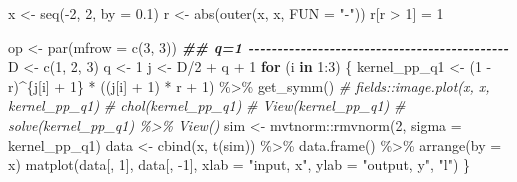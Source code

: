 \documentclass[
]{article}
\newenvironment{Shaded}{\begin{snugshade}}{\end{snugshade}}
\newcommand{\AttributeTok}[1]{\textcolor[rgb]{0.77,0.63,0.00}{#1}}
\newcommand{\CommentTok}[1]{\textcolor[rgb]{0.56,0.35,0.01}{\textit{#1}}}
\newcommand{\ControlFlowTok}[1]{\textcolor[rgb]{0.13,0.29,0.53}{\textbf{#1}}}
\newcommand{\DecValTok}[1]{\textcolor[rgb]{0.00,0.00,0.81}{#1}}
\newcommand{\DocumentationTok}[1]{\textcolor[rgb]{0.56,0.35,0.01}{\textbf{\textit{#1}}}}
\newcommand{\FloatTok}[1]{\textcolor[rgb]{0.00,0.00,0.81}{#1}}
\newcommand{\FunctionTok}[1]{\textcolor[rgb]{0.00,0.00,0.00}{#1}}
\newcommand{\NormalTok}[1]{#1}
\newcommand{\OtherTok}[1]{\textcolor[rgb]{0.56,0.35,0.01}{#1}}
\newcommand{\SpecialCharTok}[1]{\textcolor[rgb]{0.00,0.00,0.00}{#1}}
\newcommand{\StringTok}[1]{\textcolor[rgb]{0.31,0.60,0.02}{#1}}
\begin{document}
\begin{Shaded}
\begin{Highlighting}[]
\NormalTok{x }\OtherTok{\textless{}{-}} \FunctionTok{seq}\NormalTok{(}\SpecialCharTok{{-}}\DecValTok{2}\NormalTok{, }\DecValTok{2}\NormalTok{, }\AttributeTok{by =} \FloatTok{0.1}\NormalTok{)}
\NormalTok{r }\OtherTok{\textless{}{-}} \FunctionTok{abs}\NormalTok{(}\FunctionTok{outer}\NormalTok{(x, x, }\AttributeTok{FUN =} \StringTok{"{-}"}\NormalTok{))}
\NormalTok{r[r }\SpecialCharTok{\textgreater{}} \DecValTok{1}\NormalTok{] }\OtherTok{=} \DecValTok{1}

\NormalTok{op }\OtherTok{\textless{}{-}} \FunctionTok{par}\NormalTok{(}\AttributeTok{mfrow =} \FunctionTok{c}\NormalTok{(}\DecValTok{3}\NormalTok{, }\DecValTok{3}\NormalTok{))}
\DocumentationTok{\#\# q=1 {-}{-}{-}{-}{-}{-}{-}{-}{-}{-}{-}{-}{-}{-}{-}{-}{-}{-}{-}{-}{-}{-}{-}{-}{-}{-}{-}{-}{-}{-}{-}{-}{-}{-}{-}{-}{-}{-}{-}{-}{-}{-}{-}{-}{-}}
\NormalTok{D }\OtherTok{\textless{}{-}} \FunctionTok{c}\NormalTok{(}\DecValTok{1}\NormalTok{, }\DecValTok{2}\NormalTok{, }\DecValTok{3}\NormalTok{)}
\NormalTok{q }\OtherTok{\textless{}{-}} \DecValTok{1}
\NormalTok{j }\OtherTok{\textless{}{-}}\NormalTok{ D}\SpecialCharTok{/}\DecValTok{2} \SpecialCharTok{+}\NormalTok{ q }\SpecialCharTok{+} \DecValTok{1}
\ControlFlowTok{for}\NormalTok{ (i }\ControlFlowTok{in} \DecValTok{1}\SpecialCharTok{:}\DecValTok{3}\NormalTok{) \{}
\NormalTok{  kernel\_pp\_q1 }\OtherTok{\textless{}{-}}\NormalTok{ (}\DecValTok{1} \SpecialCharTok{{-}}\NormalTok{ r)}\SpecialCharTok{\^{}}\NormalTok{\{j[i] }\SpecialCharTok{+} \DecValTok{1}\NormalTok{\} }\SpecialCharTok{*} 
\NormalTok{    ((j[i] }\SpecialCharTok{+} \DecValTok{1}\NormalTok{) }\SpecialCharTok{*}\NormalTok{ r }\SpecialCharTok{+} \DecValTok{1}\NormalTok{) }\SpecialCharTok{\%\textgreater{}\%} \FunctionTok{get\_symm}\NormalTok{()}
  \CommentTok{\# fields::image.plot(x, x, kernel\_pp\_q1)}
  \CommentTok{\# chol(kernel\_pp\_q1)}
  \CommentTok{\# View(kernel\_pp\_q1)}
  \CommentTok{\# solve(kernel\_pp\_q1) \%\textgreater{}\% View()}
\NormalTok{  sim }\OtherTok{\textless{}{-}}\NormalTok{ mvtnorm}\SpecialCharTok{::}\FunctionTok{rmvnorm}\NormalTok{(}\DecValTok{2}\NormalTok{, }\AttributeTok{sigma =}\NormalTok{ kernel\_pp\_q1)}
\NormalTok{  data }\OtherTok{\textless{}{-}} \FunctionTok{cbind}\NormalTok{(x, }\FunctionTok{t}\NormalTok{(sim)) }\SpecialCharTok{\%\textgreater{}\%} 
    \FunctionTok{data.frame}\NormalTok{() }\SpecialCharTok{\%\textgreater{}\%}
    \FunctionTok{arrange}\NormalTok{(}\AttributeTok{by =}\NormalTok{ x)}
  \FunctionTok{matplot}\NormalTok{(data[, }\DecValTok{1}\NormalTok{], data[, }\SpecialCharTok{{-}}\DecValTok{1}\NormalTok{], }\AttributeTok{xlab =} \StringTok{"input, x"}\NormalTok{, }\AttributeTok{ylab =} \StringTok{"output, y"}\NormalTok{, }\StringTok{"l"}\NormalTok{)}
\NormalTok{\}}



\end{Highlighting}
\end{Shaded}
\end{document}
